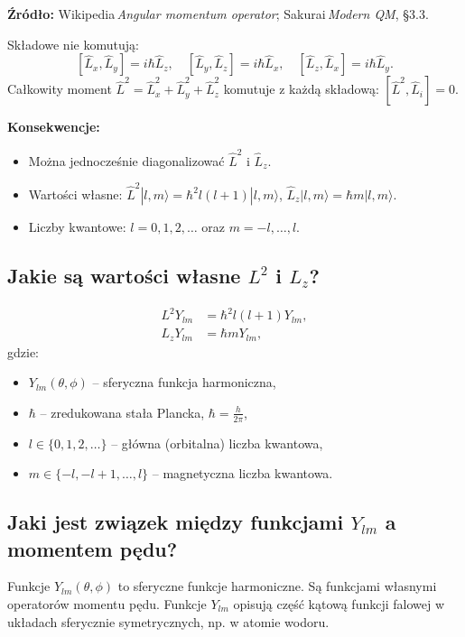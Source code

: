 \textbf{Źródło:} Wikipedia\,\emph{Angular momentum operator}; Sakurai\,\emph{Modern QM}, \S3.3.
		
		Składowe nie komutują:
		\[
		[\hat L_x,\hat L_y]=i\hbar\hat L_z,\quad
		[\hat L_y,\hat L_z]=i\hbar\hat L_x,\quad
		[\hat L_z,\hat L_x]=i\hbar\hat L_y.
		\]
		Całkowity moment
		\(
		\hat L^{2}=\hat L_x^{2}+\hat L_y^{2}+\hat L_z^{2}
		\)
		komutuje z każdą składową: $[\hat L^{2},\hat L_i]=0$.
		
		\textbf{Konsekwencje:}
		\begin{itemize}
			\item Można jednocześnie diagonalizować $\hat L^{2}$ i $\hat L_z$.
			\item Wartości własne: $\hat L^{2}|l,m\rangle=\hbar^{2}l(l+1)|l,m\rangle$, $\hat L_z|l,m\rangle=\hbar m|l,m\rangle$.
			\item Liczby kwantowe: $l=0,1,2,\dots$ oraz $m=-l,\dots,l$.
		\end{itemize}

\subsection{Jakie są wartości własne $L^2$ i $L_z$?}

\begin{align*}
L^2 Y_{lm} &= \hbar^2 l(l+1) Y_{lm}, \\
L_z Y_{lm} &= \hbar m Y_{lm},
\end{align*}
gdzie:
\begin{itemize}
  \item \( Y_{lm}(\theta, \phi) \) -- sferyczna funkcja harmoniczna,
  \item \( \hbar \) -- zredukowana stała Plancka, \( \hbar = \frac{h}{2\pi} \),
  \item \( l \in \{0, 1, 2, \ldots\} \) -- główna (orbitalna) liczba kwantowa,
  \item \( m \in \{-l, -l+1, \ldots, l\} \) -- magnetyczna liczba kwantowa.
\end{itemize}

\subsection{Jaki jest związek między funkcjami $Y_{lm}$ a momentem pędu?}

Funkcje \( Y_{lm}(\theta, \phi) \) to sferyczne funkcje harmoniczne. Są funkcjami własnymi operatorów momentu pędu. Funkcje \( Y_{lm} \) opisują część kątową funkcji falowej w układach sferycznie symetrycznych, np. w atomie wodoru.

